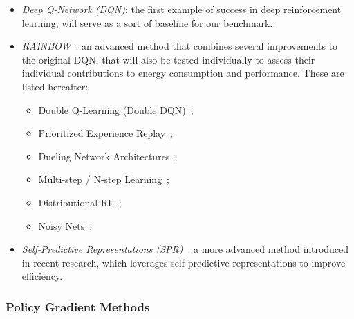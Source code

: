 \begin{itemize}
	\item \textit{Deep Q-Network (DQN)}: the first example of success in deep reinforcement learning, will serve as a sort of baseline for our benchmark.
	\item \textit{RAINBOW}~\cite{hessel:rainbow}: an advanced method that combines several improvements to the original DQN, that will also be tested individually to assess their individual contributions to energy consumption and performance. These are listed hereafter:
	\begin{itemize}
		\item Double Q-Learning (Double DQN)~\cite{van:double_q};
		\item Prioritized Experience Replay~\cite{schaul:prioritized};
		\item Dueling Network Architectures~\cite{wang:dueling};
		\item Multi-step / N-step Learning~\cite{peng:incremental};
		\item Distributional RL~\cite{bellemare:distributional};
		\item Noisy Nets~\cite{fortunato:noisy};
	\end{itemize}
	\item \textit{Self-Predictive Representations (SPR)}~\cite{schwarzer:spr}: a more advanced method introduced in recent research, which leverages self-predictive representations to improve efficiency.
\end{itemize}

\subsubsection{Policy Gradient Methods}

